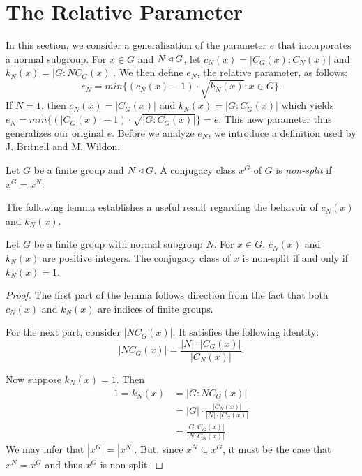 \documentclass[main.tex]{subfiles}
\begin{document}
\section{The Relative Parameter}

In this section, we consider a generalization of the parameter $e$ that incorporates a normal subgroup. For $x \in G$ and $N \triangleleft G$, let $c_N(x) = |C_G(x):C_N(x)|$ and $k_N(x) = |G:NC_G(x)|$. We then define $e_N$, the relative parameter, as follows:
$$e_N = min\{(c_N(x) - 1) \cdot \sqrt{k_N(x)} : x \in G\}\text{.}$$
If $N=1$, then $c_N(x) = |C_G(x)|$ and $k_N(x) = |G:C_G(x)|$ which yields $e_N = min\{(|C_G(x)| - 1)\cdot\sqrt{|G:C_G(x)|}\} = e$. This new parameter thus generalizes our original $e$. Before we analyze $e_N$, we introduce a definition used by J. Britnell and M. Wildon.

\hss

\begin{definition}
Let $G$ be a finite group and $N \triangleleft G$. A conjugacy class $x^G$ of $G$ is \emph{non-split} if $x^G = x^N$.
\end{definition}

\hss

The following lemma establishes a useful result regarding the behavoir of $c_N(x)$ and $k_N(x)$.

\begin{lemma}\label{kn1}
Let $G$ be a finite group with normal subgroup $N$. For $x \in G$, $c_N(x)$ and $k_N(x)$ are positive integers. The conjugacy class of $x$ is non-split if and only if $k_N(x) = 1$.
\end{lemma}

\begin{proof}
The first part of the lemma follows direction from the fact that both $c_N(x)$ and $k_N(x)$ are indices of finite groups.

For the next part, consider $|NC_G(x)|$. It satisfies the following identity:
$$|NC_G(x)| = \frac{|N| \cdot |C_G(x)|}{|C_N(x)|}\text{.}$$

Now suppose $k_N(x) = 1$. Then
\begin{align*}
1 = k_N(x) &= |G : NC_G(x)| \\
&= |G| \cdot \frac{|C_N(x)|}{|N| \cdot |C_G(x)|} \\
&= \frac{|G : C_G(x)|}{|N : C_N(x)|}
\end{align*}
We may infer that $|x^G| = |x^N|$. But, since $x^N \subseteq x^G$, it must be the case that $x^N = x^G$ and thus $x^G$ is non-split.
\end{proof}
\end{document}
